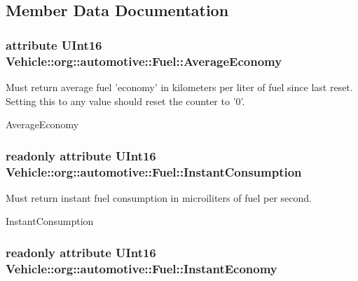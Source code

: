 \subsection{Member Data Documentation}
\hypertarget{interfaceVehicle_1_1org_1_1automotive_1_1Fuel_a7f43ff6e1f43b6d585f8b55140f4b06c}{
\subsubsection[{Average\-Economy}]{\setlength{\rightskip}{0pt plus 5cm}attribute U\-Int16 Vehicle\-::org\-::automotive\-::\-Fuel\-::\-Average\-Economy}}\label{interfaceVehicle_1_1org_1_1automotive_1_1Fuel_a7f43ff6e1f43b6d585f8b55140f4b06c}


Must return average fuel 'economy' in kilometers per liter of fuel since last reset. Setting this to any value should reset the counter to '0'. 

Average\-Economy \hypertarget{interfaceVehicle_1_1org_1_1automotive_1_1Fuel_aa8ade0a03a293082ca0dd47018f562c2}{
\subsubsection[{Instant\-Consumption}]{\setlength{\rightskip}{0pt plus 5cm}readonly attribute U\-Int16 Vehicle\-::org\-::automotive\-::\-Fuel\-::\-Instant\-Consumption}}\label{interfaceVehicle_1_1org_1_1automotive_1_1Fuel_aa8ade0a03a293082ca0dd47018f562c2}


Must return instant fuel consumption in microiliters of fuel per second. 

Instant\-Consumption \hypertarget{interfaceVehicle_1_1org_1_1automotive_1_1Fuel_a1c49611a6ebc45b76c8a692bcfe4da37}{
\subsubsection[{Instant\-Economy}]{\setlength{\rightskip}{0pt plus 5cm}readonly attribute U\-Int16 Vehicle\-::org\-::automotive\-::\-Fuel\-::\-Instant\-Economy}}\label{interfaceVehicle_1_1org_1_1automotive_1_1Fuel_a1c49611a6ebc45b76c8a692bcfe4da37}


